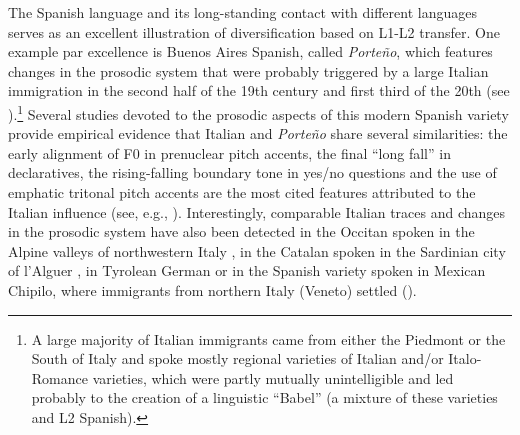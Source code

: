 The Spanish language and its long-standing contact with different languages serves as an excellent illustration of diversification based on L1-L2 transfer. One example par excellence is Buenos Aires Spanish, called \textit{Porteño}, which features changes in the prosodic system that were probably triggered by a large Italian immigration in the second half of the 19th century and first third of the 20th (see  \citealt{VidaldeBattini1964, FontanelladeWeinberg1987, Nascimbene1988, Baily1999, Devoto2002}).\footnote{A large majority of Italian immigrants came from either the Piedmont or the South of Italy and spoke mostly regional varieties of Italian and/or Italo-Romance varieties, which were partly mutually unintelligible and led probably to the creation of a linguistic “Babel” (a mixture of these varieties and L2 Spanish).} Several studies devoted to the prosodic aspects of this modern Spanish variety provide empirical evidence that Italian and \textit{Porteño} share several similarities: the early alignment of F0 in prenuclear pitch accents, the final “long fall” in declaratives, the rising-falling boundary tone in yes/no questions and the use of emphatic tritonal pitch accents are the most cited features attributed to the Italian influence (see, e.g., \citealt{Kaisse2001, ColantoniGurlekian2004, GabrielEtAl2010,GabrielEtAl2011, FeldhausenEtAl2011, BenetEtAl2012, PeškováEtAl2012,PeškováEtAl2013}). Interestingly, comparable Italian traces and changes in the prosodic system have also been detected in the Occitan spoken in the Alpine valleys of northwestern Italy \citep{Sichel-BazinEtAl2015}, in the Catalan spoken in the Sardinian city of l’Alguer \citep{PrietoEtAl2015a}, in Tyrolean German \citep{Barker2005} or in the Spanish variety spoken in Mexican Chipilo, where immigrants from northern Italy (Veneto) settled (\citealt{BarnesMichnowicz2015}).



